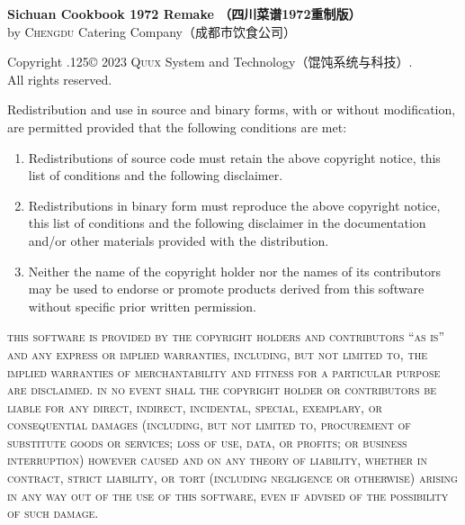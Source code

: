 \begingroup%

\newcommand\XeLaTeX{%
	\rmfamily%
	\footnotesize%
	X\kern-.1em\lower.5ex\hbox{\scalebox{-1}[1]{E}}\kern-.15em%
	L\kern-.36em\lower-.428571ex\hbox{\tiny{A}}\kern-.15em%
	T\kern-.1667em\lower.5ex\hbox{E}\kern-.125emX%
}

\footnotesize%
\singlespacing%
\setlength{\parindent}{0pt}%
\setlength{\parskip}{.1875\baselineskip}%
{\sffamily\bfseries Sichuan Cookbook 1972 Remake\!%
（四川菜谱1972重制版）}\\
by \textsc{Chengdu} Catering Company\!（成都市饮食公司）

\null

Copyright {\lower.125\baselineskip\hbox{\normalsize\copyright}} 2023
\textsc{Quux} System and Technology\!（馄饨系统与科技）\!\!.\\%
All rights reserved.

Redistribution and use in source and binary forms, with or without
modification, are permitted provided that the following conditions are met:

\begin{enumerate}
\item Redistributions of source code must retain the above copyright notice,
      this list of conditions and the following disclaimer.

\item Redistributions in binary form must reproduce the above copyright notice,
      this list of conditions and the following disclaimer in the documentation
      and\slash or other materials provided with the distribution.

\item Neither the name of the copyright holder nor the names of its
      contributors may be used to endorse or promote products derived from
      this software without specific prior written permission.
\end{enumerate}

\begingroup%
%
\textsc{this software is provided by the copyright holders and contributors
``as is'' and any express or implied warranties, including, but not limited to,
the implied warranties of merchantability and fitness for a particular purpose
are disclaimed. in no event shall the copyright holder or contributors be
liable for any direct, indirect, incidental, special, exemplary, or
consequential damages (including, but not limited to, procurement of
substitute goods or services; loss of use, data, or profits; or business
interruption) however caused and on any theory of liability, whether in
contract, strict liability, or tort (including negligence or otherwise)
arising in any way out of the use of this software, even if advised of the
possibility of such damage.}


